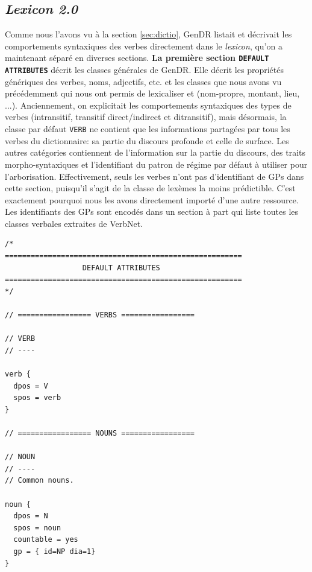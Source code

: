 \subsection{\emph{Lexicon 2.0}}
Comme nous l'avons vu à la section \ref{sec:dictio}, GenDR listait et décrivait les comportements syntaxiques des verbes directement dans le \emph{lexicon}, qu'on a maintenant séparé en diverses sections. \textbf{La première section \texttt{DEFAULT ATTRIBUTES}} décrit les classes générales de GenDR. Elle décrit les propriétés génériques des verbes, noms,  adjectifs, etc. et les classes que nous avons vu précédemment qui nous ont permis de lexicaliser  et  (nom-propre, montant, lieu, ...). Anciennement, on explicitait les comportements syntaxiques des types de verbes (intransitif, transitif direct/indirect et ditransitif), mais désormais, la classe par défaut \texttt{VERB} ne contient que les informations partagées par tous les verbes du dictionnaire: sa partie du discours profonde et celle de surface. Les autres catégories contiennent de l'information sur la partie du discours, des traits morpho-syntaxiques et l'identifiant du patron de régime par défaut à utiliser pour l'arborisation. Effectivement, seuls les verbes n'ont pas d'identifiant de \acp{GP} dans cette section, puisqu'il s'agit de la classe de lexèmes la moins prédictible. C'est exactement pourquoi nous les avons directement importé d'une autre ressource. Les identifiants des \acp{GP} sont encodés dans un section à part qui liste toutes les classes verbales extraites de VerbNet.

\begin{minipage}{\linewidth}
\begin{lstlisting}[language=XML, caption = Attributs par défaut des classes génériques, label=classedef]
/*
=======================================================
                  DEFAULT ATTRIBUTES
=======================================================
*/

// ================= VERBS =================

// VERB
// ----

verb {
  dpos = V
  spos = verb
}

// ================= NOUNS =================

// NOUN
// ----
// Common nouns.

noun {
  dpos = N
  spos = noun
  countable = yes
  gp = { id=NP dia=1}
}
\end{lstlisting}
\end{minipage}

